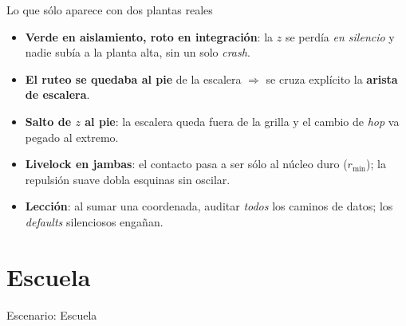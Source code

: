 \documentclass[10pt,aspectratio=169,t]{beamer}
\begin{document}
\begin{frame}[c]{Lo que sólo aparece con dos plantas reales}
  \begin{itemize}
    \item \textbf{Verde en aislamiento, roto en integración}: la $z$ se perdía \emph{en
      silencio} y nadie subía a la planta alta, sin un solo \emph{crash}.
    \item \textbf{El ruteo se quedaba al pie} de la escalera $\Rightarrow$ se cruza
      explícito la \textbf{arista de escalera}.
    \item \textbf{Salto de $z$ al pie}: la escalera queda fuera de la grilla y el cambio de
      \emph{hop} va pegado al extremo.
    \item \textbf{Livelock en jambas}: el contacto pasa a ser sólo al núcleo duro
      ($r_{\min}$); la repulsión suave dobla esquinas sin oscilar.
    \item \textbf{Lección}: al sumar una coordenada, auditar \emph{todos} los caminos de
      datos; los \emph{defaults} silenciosos engañan.
  \end{itemize}
\end{frame}

\section{Escuela}

\begin{frame}[plain,c]
  \centering
  {\fontsize{40}{48}\selectfont Escenario: Escuela\par}
\end{frame}
\end{document}
